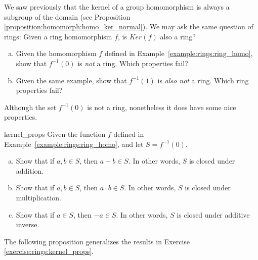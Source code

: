 We saw previously that the kernel of a group homomorphism is always a subgroup of the domain (see Proposition \ref{proposition:homomorph:homo_ker_normal}).  We may ask the same question of rings:  Given a ring homomorphism $f$, is $Ker(f)$ also a ring?

\begin{exercise}{}
\begin{enumerate}[(a)]
    \item Given the homomorphism $f$ defined in Example~\ref{example:rings:ring_homo}, show that $f^{-1}(0)$ is \emph{not} a ring.  Which properties fail?
    \item Given the same example, show that $f^{-1}(1)$ is \emph{also not} a ring.  Which ring properties fail?
\end{enumerate}
\end{exercise}

Although the set $f^{-1}(0)$ is not a ring, nonetheless it does have some nice properties.

\begin{exercise}{kernel_props}
Given the function $f$ defined in Example~\ref{example:rings:ring_homo}, and let $S=f^{-1}(0)$.
\begin{enumerate}[(a)]
\item Show that if $a,b \in S$, then $a+b \in S$.  In other words, $S$ is closed under addition.
\item Show that if $a,b \in S$, then $a\cdot b \in S$.  In other words, $S$ is closed under multiplication.

\item Show that if $a \in S$, then $-a \in S$.  In other words, $S$ is closed under additive inverse.
\end{enumerate}
\end{exercise}

The following proposition generalizes the results in Exercise \ref{exercise:rings:kernel_props}.

